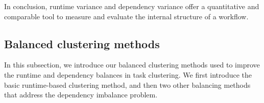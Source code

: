 In conclusion, runtime variance and dependency variance offer a quantitative and comparable tool to measure and evaluate the internal structure of a workflow. 



\subsection{Balanced clustering methods}
\label{sec:methods}
In this subsection, we introduce our balanced clustering methods used to improve the runtime and dependency balances in task clustering. We first introduce the basic runtime-based clustering method, and then two other balancing methods that address the dependency imbalance problem. %



